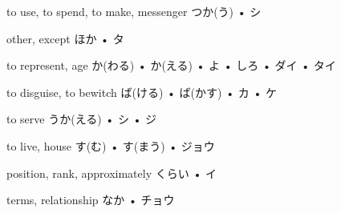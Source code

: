 



\setcounter{cardnum}{1}

		{to use, to spend, to make, messenger}
		{つか(う) • シ}
		{}{}
		{}{}
		{}{}
		{}{}
		{}{}

		{other, except}
		{ほか • タ}
		{}{}
		{}{}
		{}{}
		{}{}
		{}{}

		{to represent, age}
		{か(わる) • か(える) • よ • しろ • ダイ • タイ}
		{}{}
		{}{}
		{}{}
		{}{}
		{}{}

		{to disguise, to bewitch}
		{ば(ける) • ば(かす) • カ • ケ}
		{}{}
		{}{}
		{}{}
		{}{}
		{}{}

		{to serve}
		{うか(える) • シ • ジ}
		{}{}
		{}{}
		{}{}
		{}{}
		{}{}

		{to live, house}
		{す(む) • す(まう) • ジョウ}
		{}{}
		{}{}
		{}{}
		{}{}
		{}{}

		{position, rank, approximately}
		{くらい • イ}
		{}{}
		{}{}
		{}{}
		{}{}
		{}{}

		{terms, relationship}
		{なか • チョウ}
		{}{}
		{}{}
		{}{}
		{}{}
		{}{}

